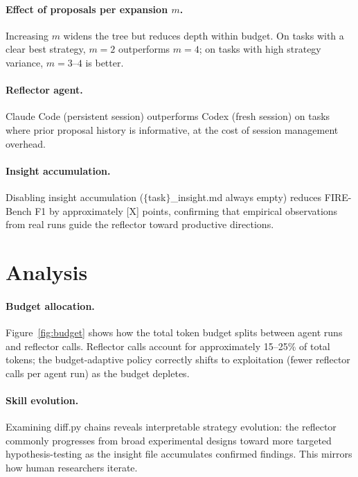 \documentclass{article}
\begin{document}
\paragraph{Effect of proposals per expansion $m$.}
Increasing $m$ widens the tree but reduces depth within budget.
On tasks with a clear best strategy, $m=2$ outperforms $m=4$; on tasks with high strategy variance, $m=3$--$4$ is better.

\paragraph{Reflector agent.}
Claude Code (persistent session) outperforms Codex (fresh session) on tasks where prior proposal history is informative, at the cost of session management overhead.

\paragraph{Insight accumulation.}
Disabling insight accumulation ($\{$task$\}$\_insight.md always empty) reduces FIRE-Bench F1 by approximately [X] points, confirming that empirical observations from real runs guide the reflector toward productive directions.

\section{Analysis}
\label{sec:analysis}

\paragraph{Budget allocation.}
Figure~\ref{fig:budget} shows how the total token budget splits between agent runs and reflector calls.
Reflector calls account for approximately 15--25\% of total tokens; the budget-adaptive policy correctly shifts to exploitation (fewer reflector calls per agent run) as the budget depletes.

\paragraph{Skill evolution.}
Examining diff.py chains reveals interpretable strategy evolution: the reflector commonly progresses from broad experimental designs toward more targeted hypothesis-testing as the insight file accumulates confirmed findings.
This mirrors how human researchers iterate.
\end{document}
